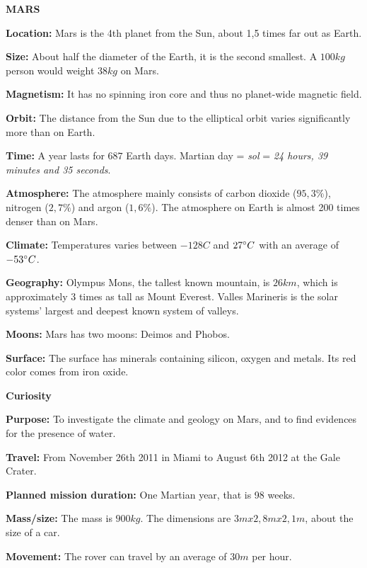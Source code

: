 \begin{tcolorbox}[colback=red!5,colframe=DarkRed!40!black,title=Mars \& Curiosity: The Red Planet and the rover]
\textbf{\large{MARS}}

\textbf{Location:} Mars is the 4th planet from the Sun, about 1,5 times far out as Earth.

\textbf{Size:} About half the diameter of the Earth, it is the second smallest.
A $100 kg$ person would weight $38 kg$ on Mars.

\textbf{Magnetism:} It has no spinning iron core and thus no planet-wide magnetic field.

\textbf{Orbit:} The distance from the Sun due to the elliptical orbit varies significantly more than on Earth.

\textbf{Time:} A year lasts for $687$ Earth days.
Martian day = \textit{sol} = \textit{24 hours, 39 minutes and 35 seconds}.

\textbf{Atmosphere:} The atmosphere mainly consists of carbon dioxide ($95,3 \%$), nitrogen ($2,7 \%$) and argon ($1,6\%$).
The atmosphere on Earth is almost 200 times denser than on Mars.

\textbf{Climate:} Temperatures varies between $-128C$ and $27 \degree C$ with an average of $-53 \degree C$.

\textbf{Geography:} Olympus Mons, the tallest known mountain, is $26 km$, which is approximately 3 times as tall as Mount Everest.
Valles Marineris is the solar systems' largest and deepest known system of valleys.

\textbf{Moons:} Mars has two moons: Deimos and Phobos.

\textbf{Surface:} The surface has minerals containing silicon, oxygen and metals.
Its red color comes from iron oxide.

\vspace{5mm}

\textbf{\large{Curiosity}}

\textbf{Purpose:} To investigate the climate and geology on Mars, and to find evidences for the presence of water.

\textbf{Travel:} From November 26th 2011 in Miami to August 6th 2012 at the Gale Crater.

\textbf{Planned mission duration:} One Martian year, that is 98 weeks.

\textbf{Mass/size:} The mass is $900 kg$.
The dimensions are $3 m x 2,8 m x 2,1 m$, about the size of a car.

\textbf{Movement:} The rover can travel by an average of $30 m$ per hour.


\end{tcolorbox}
